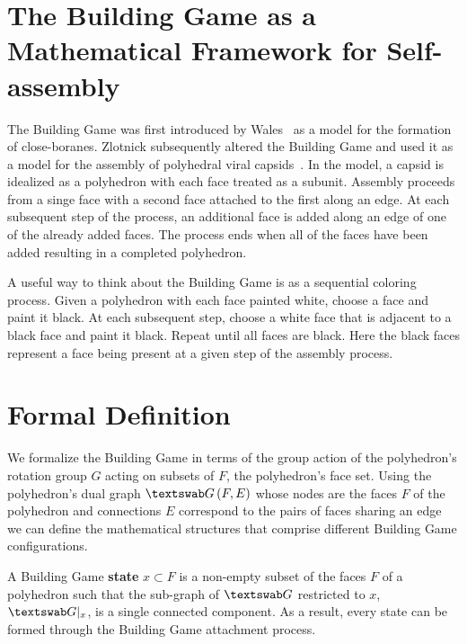 \label{chp:bgm}
\section{The Building Game as a Mathematical Framework for Self-assembly}

The Building Game was first introduced by Wales~\cite{Wales1987} as a model for the formation of close-boranes. Zlotnick subsequently altered the Building Game and used it as a model for the assembly of polyhedral viral capsids~\cite{Zlotnick1994}. In the model, a capsid is idealized as a polyhedron with each face treated as a subunit. Assembly proceeds from a singe face with a second face attached to the first along an edge. At each subsequent step of the process, an additional face is added along an edge of one of the already added faces. The process ends when all of the faces have been added resulting in a completed polyhedron.

A useful way to think about the Building Game is as a sequential coloring process. Given a polyhedron with each face painted white, choose a face and paint it black. At each subsequent step, choose a white face that is adjacent to a black face and paint it black. Repeat until all faces are black. Here the black faces represent a face being present at a given step of the assembly process.



\section{Formal Definition}
We formalize the Building Game in terms of the group action of the polyhedron's rotation group $G$ acting on subsets of $F$, the polyhedron's face set. Using the polyhedron's dual graph $\PolyGraph\left(F, E\right)$ whose nodes are the faces $F$ of the polyhedron and connections $E$ correspond to the pairs of faces sharing an edge we can define the mathematical structures that comprise different Building Game configurations.



\begin{mydef}
  A Building Game \textbf{state} $x \subset F$ is a non-empty subset of the faces $F$ of a polyhedron such that the sub-graph of $\PolyGraph$ restricted to $x$, $\PolyGraph|_x$, is a single connected component. As a result, every state can be formed through the Building Game attachment process.  
\end{mydef} 

